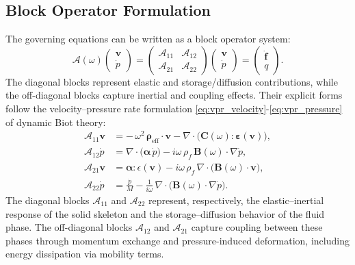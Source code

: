 \documentclass[pdflatex,sn-mathphys-num]{sn-jnl}
\theoremstyle{thmstyleone}%
\theoremstyle{thmstyletwo}%
\theoremstyle{thmstylethree}%
\theoremstyle{definition}
\begin{document}
	\subsection{Block Operator Formulation}
	
	The governing equations can be written as a block operator system:
	\[
	\mathcal{A}(\omega)
	\begin{pmatrix}
		\mathbf{v} \\
		\dot{p}
	\end{pmatrix}
	=
	\begin{pmatrix}
		\mathcal{A}_{11} & \mathcal{A}_{12} \\
		\mathcal{A}_{21} & \mathcal{A}_{22}
	\end{pmatrix}
	\begin{pmatrix}
		\mathbf{v} \\
		\dot{p}
	\end{pmatrix}
	=
	\begin{pmatrix}
		\dot{\mathbf{f}} \\
		q
	\end{pmatrix}.
	\]
	The diagonal blocks represent elastic and storage/diffusion contributions, while the off-diagonal blocks capture inertial and coupling effects. Their explicit forms follow the velocity–pressure rate formulation \eqref{eq:vpr_velocity}-\eqref{eq:vpr_pressure} of dynamic Biot theory:
	\begin{subequations}\label{eq:block-operators-vpr}
		\begin{align}
			\mathcal{A}_{11}\mathbf{v} &=
			-\,\omega^2\, \boldsymbol{\rho}_{\mathrm{eff}}\cdot \mathbf{v}
			- \nabla \cdot\big( \mathbf{C}(\omega) : \boldsymbol{\varepsilon}(\mathbf{v}) \big),\\
			\mathcal{A}_{12}\dot{p} &=
			\nabla \cdot\big( \boldsymbol{\alpha}\, \dot{p} \big)
			- i\omega\, \rho_f\, \mathbf{B}(\omega)\cdot \nabla \dot{p},\\
			\mathcal{A}_{21}\mathbf{v} &=
			\boldsymbol{\alpha}:\epsilon(\mathbf{v})
			- i\omega\, \rho_f\, \nabla \cdot\big( \mathbf{B}(\omega)\cdot \mathbf{v} \big),\\
			\mathcal{A}_{22}\dot{p} &=
			\frac{\dot{p}}{M}
			- \frac{1}{i\omega}\, \nabla \cdot\big( \mathbf{B}(\omega)\cdot \nabla \dot{p} \big).
		\end{align}
	\end{subequations}
	The diagonal blocks $\mathcal{A}_{11}$ and $\mathcal{A}_{22}$ represent, respectively, the elastic–inertial response of the solid skeleton and the storage–diffusion behavior of the fluid phase. The off-diagonal blocks $\mathcal{A}_{12}$ and $\mathcal{A}_{21}$ capture coupling between these phases through momentum exchange and pressure-induced deformation, including energy dissipation via mobility terms.
	
\end{document}
